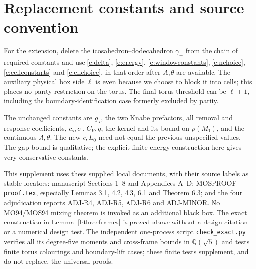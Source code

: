 \documentclass[11pt,reqno]{amsart}
\theoremstyle{definition}
\begin{document}
\section{Replacement constants and source convention}

For the extension, delete the icosahedron--dodecahedron
$\gamma_\pm$ from the chain of required constants and use
\eqref{e:delta}, \eqref{e:energy}, \eqref{e:windowconstants},
\eqref{e:nchoice}, \eqref{e:cellconstants} and \eqref{e:ellchoice},
in that order after $A,\theta$ are available. The auxiliary physical
box side $\ell$ is even because we choose to block it into cells;
this places no parity restriction on the torus. The final torus
threshold can be $\ell+1$, including the boundary-identification
case formerly excluded by parity.

The unchanged constants are $g_\star$, the two Knabe prefactors,
all removal and response coefficients, $c_{\mathrm s},c_{\mathrm t}$,
$C_V,q$, the kernel and its bound on $\rho(M_1)$, and the continuous
$A,\theta$. The new $c,L_0$ need not equal the previous unspecified
values. The gap bound is qualitative; the explicit finite-energy
construction here gives very conservative constants.

This supplement uses these supplied local documents, with their
source labels as stable locators: manuscript Sections 1--8 and
Appendices A--D; MOSPROOF \texttt{proof.tex}, especially Lemmas 3.1,
4.2, 4.3, 6.1 and Theorem 6.3; and the four adjudication reports
ADJ-R4, ADJ-R5, ADJ-R6 and ADJ-MINOR. No MO94/MOS94 mixing theorem
is invoked as an additional black box. The exact construction in
Lemma~\ref{l:threeframes} is proved above without a design citation
or a numerical design test. The independent one-process script
\texttt{check\_exact.py} verifies all its degree-five moments and
cross-frame bounds in $\mathbb Q(\sqrt5)$ and tests finite torus
colourings and boundary-lift cases; these finite tests supplement,
and do not replace, the universal proofs.
\end{document}
